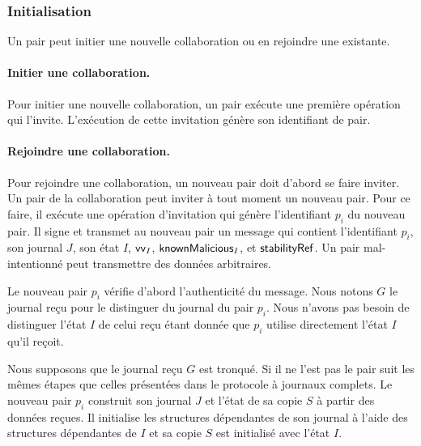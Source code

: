 \subsubsection{Initialisation}

Un pair peut initier une nouvelle collaboration ou en rejoindre une existante.

\paragraph{Initier une collaboration.}
Pour initier une nouvelle collaboration, un pair exécute une première opération qui l’invite. L’exécution de cette invitation génère son identifiant de pair.

\paragraph{Rejoindre une collaboration.}
Pour rejoindre une collaboration, un nouveau pair doit d'abord se faire inviter.
Un pair de la collaboration peut inviter à tout moment un nouveau pair. Pour ce faire, il exécute une opération d’invitation qui génère l’identifiant $p_i$ du nouveau pair.
Il signe et transmet au nouveau pair un message qui contient l'identifiant $p_i$, son journal $J$, son état $I$, $\operatorname{\mathsf{vv}}_I$, $\operatorname{\mathsf{knownMalicious}}_I$, et $\operatorname{\mathsf{stabilityRef}}$.
Un pair mal-intentionné peut transmettre des données arbitraires.

Le nouveau pair $p_i$ vérifie d’abord l’authenticité du message.
Nous notons $G$ le journal reçu pour le distinguer du journal du pair $p_i$.
Nous n'avons pas besoin de distinguer l'état $I$ de celui reçu étant donnée que $p_i$ utilise directement l'état $I$ qu'il reçoit.

Nous supposons que le journal reçu $G$ est tronqué.
Si il ne l'est pas le pair suit les mêmes étapes que celles présentées dans le protocole à journaux complets.
Le nouveau pair $p_i$ construit son journal $J$ et l'état de sa copie $S$ à partir des données reçues.
Il initialise les structures dépendantes de son journal à l'aide des structures dépendantes de $I$ et sa copie $S$ est initialisé avec l'état $I$.

\clearpage

